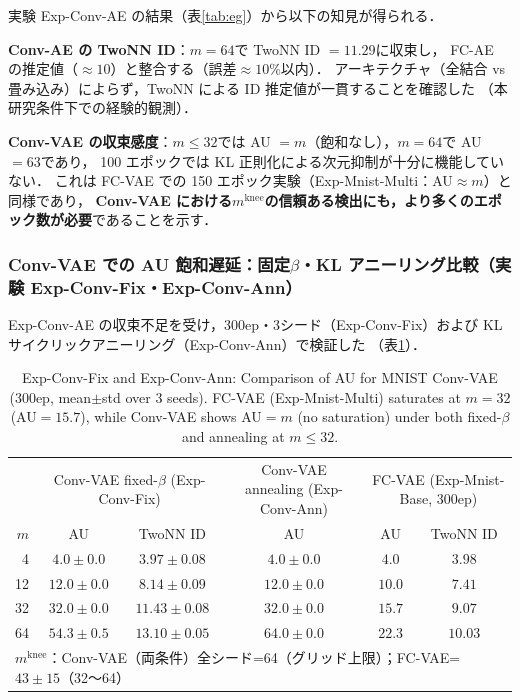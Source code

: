 \documentclass[11pt,a4paper]{jsarticle}
\newcommand{\mknee}{m^{\mathrm{knee}}}
\begin{document}
実験 Exp-Conv-AE の結果（表\ref{tab:eg}）から以下の知見が得られる．

\textbf{Conv-AE の TwoNN ID}：$m = 64$で TwoNN ID $= 11.29$に収束し，
FC-AE の推定値（$\approx 10$）と整合する（誤差$\approx 10\%$以内）．
アーキテクチャ（全結合 vs 畳み込み）によらず，TwoNN による ID 推定値が一貫することを確認した
（本研究条件下での経験的観測）．

\textbf{Conv-VAE の収束感度}：$m \leq 32$では AU $= m$（飽和なし），$m = 64$で AU $= 63$であり，
100 エポックでは KL 正則化による次元抑制が十分に機能していない．
これは FC-VAE での 150 エポック実験（Exp-Mnist-Multi：AU$\approx m$）と同様であり，
\textbf{Conv-VAE における$\mknee$の信頼ある検出にも，より多くのエポック数が必要}であることを示す．

\subsubsection{Conv-VAE での AU 飽和遅延：固定$\beta$・KL アニーリング比較（実験 Exp-Conv-Fix・Exp-Conv-Ann）}
\label{sec:exp_conv_300ep}

Exp-Conv-AE の収束不足を受け，300ep・3シード（Exp-Conv-Fix）および KL サイクリックアニーリング（Exp-Conv-Ann）で検証した
（表\ref{tab:eh_conv_vae}）．

\begin{table}[H]
\centering
\caption{Exp-Conv-Fix and Exp-Conv-Ann: Comparison of AU for MNIST Conv-VAE (300ep, mean$\pm$std over 3 seeds). FC-VAE (Exp-Mnist-Multi) saturates at $m=32$ (AU$=15.7$), while Conv-VAE shows AU$=m$ (no saturation) under both fixed-$\beta$ and annealing at $m \leq 32$.}
\label{tab:eh_conv_vae}
\small
\begin{tabular}{r ccc cc}
\toprule
 & \multicolumn{2}{c}{Conv-VAE fixed-$\beta$ (Exp-Conv-Fix)} & \multicolumn{1}{c}{Conv-VAE annealing (Exp-Conv-Ann)} & \multicolumn{2}{c}{FC-VAE (Exp-Mnist-Base, 300ep)} \\
$m$ & AU & TwoNN ID & AU & AU & TwoNN ID \\
\midrule
 4 & $4.0\pm0.0$ & $3.97\pm0.08$ & $4.0\pm0.0$ & $4.0$ & $3.98$ \\
12 & $12.0\pm0.0$ & $8.14\pm0.09$ & $12.0\pm0.0$ & $10.0$ & $7.41$ \\
32 & $32.0\pm0.0$ & $11.43\pm0.08$ & $32.0\pm0.0$ & $15.7$ & $9.07$ \\
64 & $54.3\pm0.5$ & $13.10\pm0.05$ & $64.0\pm0.0$ & $22.3$ & $10.03$ \\
\midrule
\multicolumn{6}{l}{$\mknee$：Conv-VAE（両条件）全シード=64（グリッド上限）；FC-VAE=$43\pm15$（32〜64）} \\
\bottomrule
\end{tabular}
\end{table}
\end{document}

